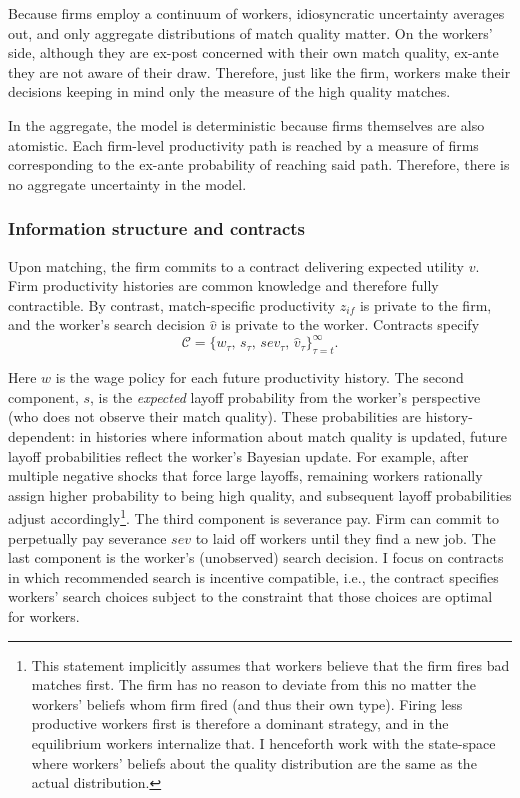 Because firms employ a continuum of workers, idiosyncratic uncertainty averages out, and only aggregate distributions of match quality matter. On the workers' side, although they are ex-post concerned with their own match quality, ex-ante they are not aware of their draw. Therefore, just like the firm, workers make their decisions keeping in mind only the measure of the high quality matches.

In the aggregate, the model is deterministic because firms themselves are also atomistic. Each firm-level productivity path is reached by a measure of firms corresponding to the ex-ante probability of reaching said path. Therefore, there is no aggregate uncertainty in the model. 


\subsubsection*{Information structure and contracts}

Upon matching, the firm commits to a contract delivering expected utility $v$.  Firm productivity histories are common knowledge and therefore fully contractible. By contrast, match-specific productivity $z_{if}$ is private to the firm, and the worker’s search decision $\hat{v}$ is private to the worker. Contracts specify
\[
\mathcal{C}=\{w_{\tau},\,s_{\tau},\,sev_{\tau},\,\hat{v}_{\tau}\}_{\tau=t}^{\infty}.
\]

Here $w$ is the wage policy for each future productivity history. The second component, $s$, is the \emph{expected} layoff probability from the worker’s perspective (who does not observe their match quality). These probabilities are history-dependent: in histories where information about match quality is updated, future layoff probabilities reflect the worker’s Bayesian update. For example, after multiple negative shocks that force large layoffs, remaining workers rationally assign higher probability to being high quality, and subsequent layoff probabilities adjust accordingly\footnote{This statement implicitly assumes that workers believe that the firm fires bad matches first. The firm has no reason to deviate from this no matter the workers' beliefs whom firm fired (and thus their own type). Firing less productive workers first is therefore a dominant strategy, and in the equilibrium workers internalize that. I henceforth work with the state-space where workers' beliefs about the quality distribution are the same as the actual distribution.}. The third component is severance pay. Firm can commit to perpetually pay severance $sev$ to laid off workers until they find a new job. The last component is the worker’s (unobserved) search decision. I focus on contracts in which recommended search is incentive compatible, i.e., the contract specifies workers’ search choices subject to the constraint that those choices are optimal for workers.

